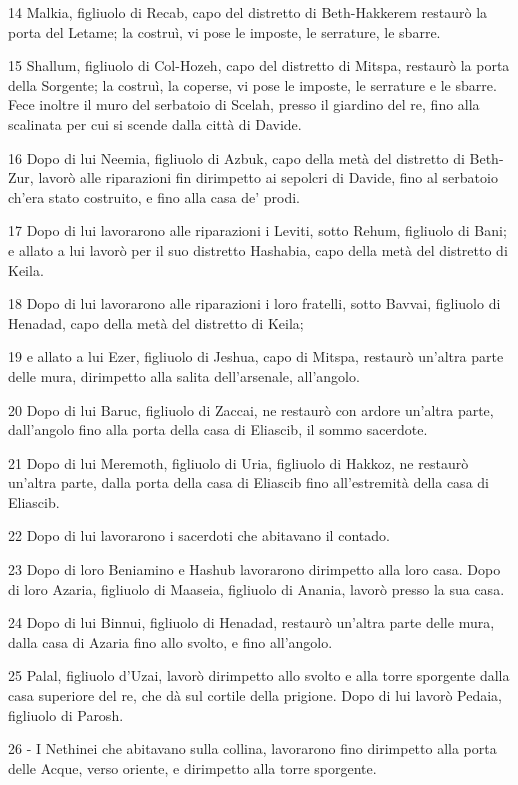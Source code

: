 \par 14 Malkia, figliuolo di Recab, capo del distretto di Beth-Hakkerem restaurò la porta del Letame; la costruì, vi pose le imposte, le serrature, le sbarre.
\par 15 Shallum, figliuolo di Col-Hozeh, capo del distretto di Mitspa, restaurò la porta della Sorgente; la costruì, la coperse, vi pose le imposte, le serrature e le sbarre. Fece inoltre il muro del serbatoio di Scelah, presso il giardino del re, fino alla scalinata per cui si scende dalla città di Davide.
\par 16 Dopo di lui Neemia, figliuolo di Azbuk, capo della metà del distretto di Beth-Zur, lavorò alle riparazioni fin dirimpetto ai sepolcri di Davide, fino al serbatoio ch'era stato costruito, e fino alla casa de' prodi.
\par 17 Dopo di lui lavorarono alle riparazioni i Leviti, sotto Rehum, figliuolo di Bani; e allato a lui lavorò per il suo distretto Hashabia, capo della metà del distretto di Keila.
\par 18 Dopo di lui lavorarono alle riparazioni i loro fratelli, sotto Bavvai, figliuolo di Henadad, capo della metà del distretto di Keila;
\par 19 e allato a lui Ezer, figliuolo di Jeshua, capo di Mitspa, restaurò un'altra parte delle mura, dirimpetto alla salita dell'arsenale, all'angolo.
\par 20 Dopo di lui Baruc, figliuolo di Zaccai, ne restaurò con ardore un'altra parte, dall'angolo fino alla porta della casa di Eliascib, il sommo sacerdote.
\par 21 Dopo di lui Meremoth, figliuolo di Uria, figliuolo di Hakkoz, ne restaurò un'altra parte, dalla porta della casa di Eliascib fino all'estremità della casa di Eliascib.
\par 22 Dopo di lui lavorarono i sacerdoti che abitavano il contado.
\par 23 Dopo di loro Beniamino e Hashub lavorarono dirimpetto alla loro casa. Dopo di loro Azaria, figliuolo di Maaseia, figliuolo di Anania, lavorò presso la sua casa.
\par 24 Dopo di lui Binnui, figliuolo di Henadad, restaurò un'altra parte delle mura, dalla casa di Azaria fino allo svolto, e fino all'angolo.
\par 25 Palal, figliuolo d'Uzai, lavorò dirimpetto allo svolto e alla torre sporgente dalla casa superiore del re, che dà sul cortile della prigione. Dopo di lui lavorò Pedaia, figliuolo di Parosh.
\par 26 - I Nethinei che abitavano sulla collina, lavorarono fino dirimpetto alla porta delle Acque, verso oriente, e dirimpetto alla torre sporgente.
